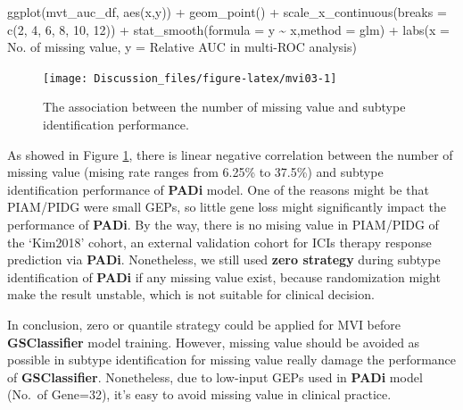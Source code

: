 \documentclass[
  12pt,
]{book}
\newenvironment{Shaded}{\begin{snugshade}}{\end{snugshade}}
\newcommand{\AttributeTok}[1]{\textcolor[rgb]{0.77,0.63,0.00}{#1}}
\newcommand{\DecValTok}[1]{\textcolor[rgb]{0.00,0.00,0.81}{#1}}
\newcommand{\FunctionTok}[1]{\textcolor[rgb]{0.00,0.00,0.00}{#1}}
\newcommand{\NormalTok}[1]{#1}
\newcommand{\SpecialCharTok}[1]{\textcolor[rgb]{0.00,0.00,0.00}{#1}}
\newcommand{\StringTok}[1]{\textcolor[rgb]{0.31,0.60,0.02}{#1}}
\begin{document}
\begin{Shaded}
\begin{Highlighting}[]
\FunctionTok{ggplot}\NormalTok{(mvt\_auc\_df, }\FunctionTok{aes}\NormalTok{(x,y)) }\SpecialCharTok{+}
  \FunctionTok{geom\_point}\NormalTok{() }\SpecialCharTok{+}
  \FunctionTok{scale\_x\_continuous}\NormalTok{(}\AttributeTok{breaks =} \FunctionTok{c}\NormalTok{(}\DecValTok{2}\NormalTok{, }\DecValTok{4}\NormalTok{, }\DecValTok{6}\NormalTok{, }\DecValTok{8}\NormalTok{, }\DecValTok{10}\NormalTok{, }\DecValTok{12}\NormalTok{)) }\SpecialCharTok{+} 
  \FunctionTok{stat\_smooth}\NormalTok{(}\AttributeTok{formula =}\NormalTok{ y }\SpecialCharTok{\textasciitilde{}}\NormalTok{ x,}\AttributeTok{method =} \StringTok{\textquotesingle{}glm\textquotesingle{}}\NormalTok{) }\SpecialCharTok{+}
  \FunctionTok{labs}\NormalTok{(}\AttributeTok{x =} \StringTok{\textquotesingle{}No. of missing value\textquotesingle{}}\NormalTok{, }
       \AttributeTok{y =} \StringTok{\textquotesingle{}Relative AUC in multi{-}ROC analysis\textquotesingle{}}\NormalTok{)}
\end{Highlighting}
\end{Shaded}

\begin{figure}

{\centering \texttt{[image: Discussion\_files/figure-latex/mvi03-1]} 

}

\caption{The association between the number of missing value and subtype identification performance.}\label{fig:mvi03}
\end{figure}

As showed in Figure \ref{fig:mvi03}, there is linear negative correlation between the number of missing value (mising rate ranges from 6.25\% to 37.5\%) and subtype identification performance of \textbf{PADi} model. One of the reasons might be that PIAM/PIDG were small GEPs, so little gene loss might significantly impact the performance of \textbf{PADi}. By the way, there is no mising value in PIAM/PIDG of the `Kim2018' cohort, an external validation cohort for ICIs therapy response prediction via \textbf{PADi}. Nonetheless, we still used \textbf{zero strategy} during subtype identification of \textbf{PADi} if any missing value exist, because randomization might make the result unstable, which is not suitable for clinical decision.

In conclusion, zero or quantile strategy could be applied for MVI before \textbf{GSClassifier} model training. However, missing value should be avoided as possible in subtype identification for missing value really damage the performance of \textbf{GSClassifier}. Nonetheless, due to low-input GEPs used in \textbf{PADi} model (No.~of Gene=32), it's easy to avoid missing value in clinical practice.
\end{document}
